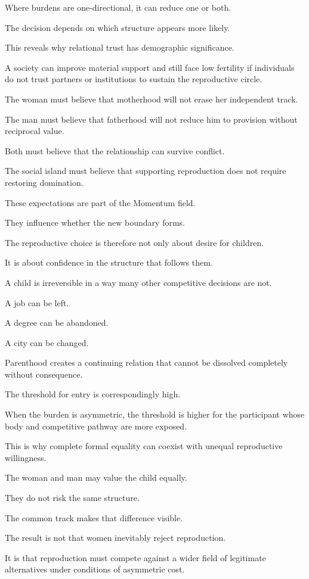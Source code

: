 Where burdens are one-directional, it can reduce one or both.

The decision depends on which structure appears more likely.

This reveals why relational trust has demographic significance.

A society can improve material support and still face low fertility if individuals do not trust partners or institutions to sustain the reproductive circle.

The woman must believe that motherhood will not erase her independent track.

The man must believe that fatherhood will not reduce him to provision without reciprocal value.

Both must believe that the relationship can survive conflict.

The social island must believe that supporting reproduction does not require restoring domination.

These expectations are part of the Momentum field.

They influence whether the new boundary forms.

The reproductive choice is therefore not only about desire for children.

It is about confidence in the structure that follows them.

A child is irreversible in a way many other competitive decisions are not.

A job can be left.

A degree can be abandoned.

A city can be changed.

Parenthood creates a continuing relation that cannot be dissolved completely without consequence.

The threshold for entry is correspondingly high.

When the burden is asymmetric, the threshold is higher for the participant whose body and competitive pathway are more exposed.

This is why complete formal equality can coexist with unequal reproductive willingness.

The woman and man may value the child equally.

They do not risk the same structure.

The common track makes that difference visible.

The result is not that women inevitably reject reproduction.

It is that reproduction must compete against a wider field of legitimate alternatives under conditions of asymmetric cost.


